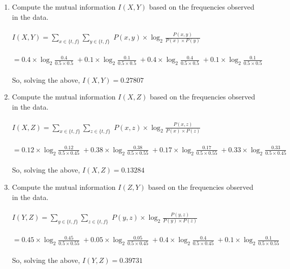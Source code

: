 \documentclass[a4paper]{article}
\theoremstyle{definition}
\newenvironment{soln}{
    \leavevmode\color{blue}\ignorespaces
}{}
\begin{document}
\begin{enumerate}
\item Compute the mutual information $I(X, Y)$ based on the frequencies observed in the data.
\begin{soln} \\ \\
$I(X, Y) = \sum_{ x \in \{t,f \} } \sum_{ y \in \{t,f \} } \; P(x,y) \times \log_2{\frac{P(x,y)}{P(x)\times P(y)}}$ \\ \\
$ = 
0.4 \times \log_2{\frac{0.4}{0.5 \times 0.5}} \; +
0.1 \times \log_2{\frac{0.1}{0.5 \times 0.5}} \; +
0.4 \times \log_2{\frac{0.4}{0.5 \times 0.5}} \; +
0.1 \times \log_2{\frac{0.1}{0.5 \times 0.5}}$ \\ \\
So, solving the above, $I(X, Y) = 0.27807$
\end{soln}


\item Compute the mutual information $I(X, Z)$ based on the frequencies observed in the data.
\begin{soln} \\ \\
$I(X, Z) = \sum_{ x \in \{t,f \} } \sum_{ z \in \{t,f \} } \; P(x,z) \times \log_2{\frac{P(x,z)}{P(x)\times P(z)}}$ \\ \\
$ = 
0.12 \times \log_2{\frac{0.12}{0.5 \times 0.45}} \; +
0.38 \times \log_2{\frac{0.38}{0.5 \times 0.55}} \; +
0.17 \times \log_2{\frac{0.17}{0.5 \times 0.55}} \; +
0.33 \times \log_2{\frac{0.33}{0.5 \times 0.45}}$ \\ \\
So, solving the above, $ I(X, Z) = 0.13284$
\end{soln}



\item Compute the mutual information $I(Z, Y)$ based on the frequencies observed in the data.
\begin{soln} \\ \\
$I(Y, Z) = \sum_{ y \in \{t,f \} } \sum_{ z \in \{t,f \} } \; P(y,z) \times \log_2{\frac{P(y,z)}{P(y)\times P(z)}}$ \\ \\
$ = 
0.45 \times \log_2{\frac{0.45}{0.5 \times 0.55}} \; +
0.05 \times \log_2{\frac{0.05}{0.5 \times 0.45}} \; +
0.4 \times \log_2{\frac{0.4}{0.5 \times 0.45}} \; +
0.1 \times \log_2{\frac{0.1}{0.5 \times 0.55}}$ \\ \\
So, solving the above, $ I(Y, Z) = 0.39731$
\end{soln}




\end{enumerate}
\end{document}
